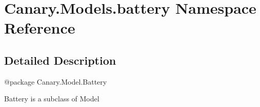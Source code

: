 \hypertarget{namespace_canary_1_1_models_1_1battery}{\section{Canary.\-Models.\-battery Namespace Reference}
\label{namespace_canary_1_1_models_1_1battery}
}


\subsection{Detailed Description}
\begin{DoxyVerb}@package Canary.Model.Battery

Battery is a subclass of Model
\end{DoxyVerb}
 